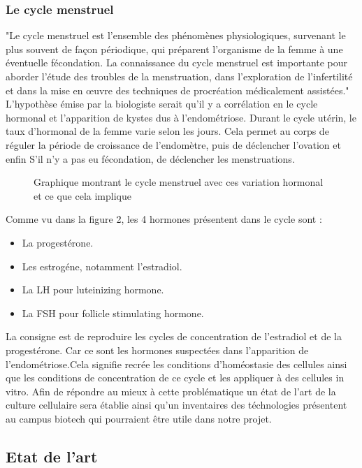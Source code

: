 \documentclass[a4paper, 11pt]{article}
\begin{document}
\subsubsection{Le cycle menstruel}
"Le cycle menstruel est l'ensemble des phénomènes physiologiques, 
survenant le plus souvent de façon périodique, qui préparent l'organisme de la femme à une éventuelle 
fécondation.
La connaissance du cycle menstruel est importante pour aborder l'étude des troubles de la menstruation, 
dans l'exploration de l'infertilité et dans la mise en œuvre des techniques de procréation médicalement
 assistées."
\cite{Cycle_menstruel}\\
L'hypothèse émise par la biologiste serait qu'il y a corrélation en le cycle hormonal et l'apparition 
de kystes dus à l'endométriose.
Durant le cycle utérin, le taux d'hormonal de la femme varie selon les jours. Cela permet 
au corps de réguler la période de croissance de l'endomètre, puis de déclencher l'ovation et enfin 
S'il n'y a pas eu fécondation, de déclencher les menstruations.
\begin{figure}[H]
    \centering
    \caption{Graphique montrant le cycle menstruel avec ces variation hormonal et ce que 
    cela implique}
    \label{fig:Cycle menstruel}
\end{figure}
Comme vu dans la figure 2, les 4 hormones présentent dans le cycle sont :
\begin{itemize}
    \item La progestérone.
    \item Les estrogéne, notamment l'estradiol.
    \item La LH pour luteinizing hormone.
    \item La FSH pour follicle stimulating hormone.
\end{itemize}
La consigne est de reproduire les cycles de concentration de l'estradiol et de la progestérone. 
Car ce sont les hormones suspectées dans l'apparition de l'endométriose.Cela signifie 
recrée les conditions d'homéostasie des cellules ainsi que les conditions de 
concentration de ce cycle et les appliquer à des cellules in vitro.
Afin de répondre au mieux à cette problématique un état de l'art de la culture 
cellulaire sera établie ainsi qu'un inventaires des téchnologies présentent au campus biotech qui 
pourraient être utile dans notre projet.
\newpage
\subsection{Etat de l'art}
\end{document}

